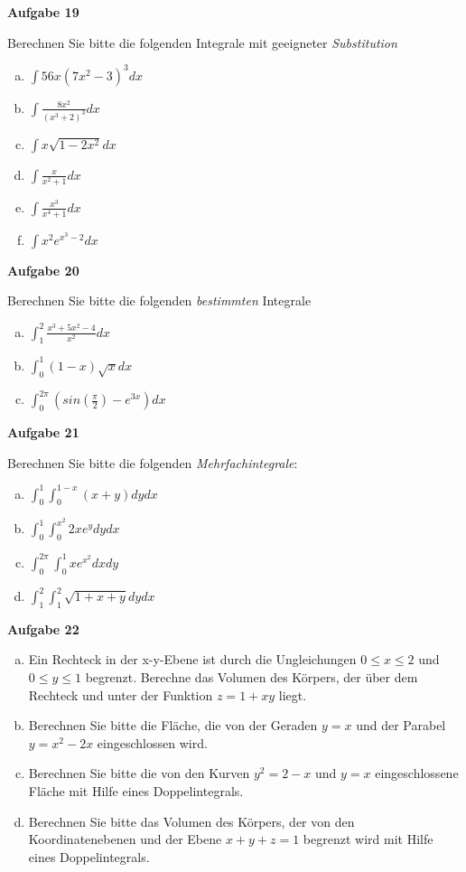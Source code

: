 \documentclass[a4paper,12pt]{article}
\newcommand{\Aufgabe}[1]{
	{
		\vspace*{0.5cm}
		\textsf{\textbf{Aufgabe #1}}
		\vspace*{0.2cm}
		
	}
}
\begin{document}
\Aufgabe{19}
Berechnen Sie bitte die folgenden Integrale mit geeigneter \textit{Substitution}
\begin{multicols}{2}
	\begin{enumerate}[a)]
		\item $\int  56x (7x^2-3)^3  dx$
		\item $\int  \frac{8x^2}{(x^3+2)^3} dx$
		\item $\int  x\sqrt{1-2x^2} dx$
		\item $\int  \frac{x}{x^2+1} dx$
		\item $\int  \frac{x^3}{x^4+1} dx$
		\item $\int x^2  e^{x^3-2} dx$
	\end{enumerate}
\end{multicols}

\Aufgabe{20}
Berechnen Sie bitte die folgenden \textit{bestimmten} Integrale
\begin{multicols}{2}
	\begin{enumerate}[a)]
		\item $\int^{2}_{1}  \frac{x^3+5x^2-4}{x^2}  dx$
		\item $\int^{1}_{0}  (1-x)\sqrt{x} dx$
		\item $\int^{2\pi}_{0} (sin(\frac{\pi}{2})-e^{3x}) dx$
	\end{enumerate}
\end{multicols}

\Aufgabe{21}
Berechnen Sie bitte die folgenden \textit{Mehrfachintegrale}:
\begin{multicols}{2}
	\begin{enumerate}[a)]
		\item $\int^{1}_{0} \int^{1-x}_{0} (x+y) dy dx$
		\item $\int^{1}_{0} \int^{x^2}_{0} 2x e^y dy dx$
		\item $\int^{2\pi}_{0} \int^{1}_{0} x e^{x^2}dx dy$
		\item $\int^{2}_{1} \int^{2}_{1} \sqrt{1+x+y} dy dx$
		
		
	\end{enumerate}
\end{multicols}


\Aufgabe{22}
\begin{enumerate}[a)]
	
	\item Ein Rechteck in der x-y-Ebene ist durch  die Ungleichungen $0\leq x \leq 2$ und $0 \leq y \leq 1$ begrenzt. Berechne das Volumen des Körpers, der über dem Rechteck und unter der Funktion $z= 1 +xy$ liegt. %
	\item Berechnen Sie bitte die Fläche, die von der Geraden $y=x$ und der Parabel $y=x^2-2x$ eingeschlossen wird. %
	\item Berechnen Sie bitte die von den Kurven $y^2=2-x$ und $y=x$ eingeschlossene Fläche mit Hilfe eines Doppelintegrals.
	\item Berechnen Sie bitte das Volumen des Körpers, der von den Koordinatenebenen
	und der Ebene $x+y+z=1$ begrenzt wird mit Hilfe eines Doppelintegrals.
	
\end{enumerate}
\end{document}
